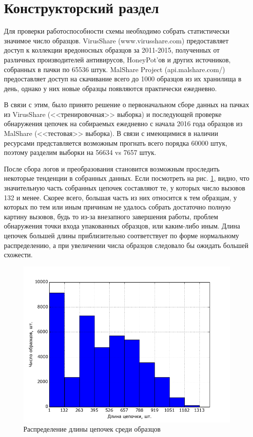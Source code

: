 \section {Конструкторский раздел}
Для проверки работоспособности схемы необходимо собрать статистически значимое число образцов. 
VirusShare (www.virusshare.com) предоставляет доступ к коллекции вредоносных образцов за 2011-2015, полученных от различных производителей антивирусов, HoneyPot'ов и других источников, собранных в пачки по 65536 штук.
MalShare Project (api.malshare.com/) предоставляет доступ на скачивание  всего до 1000 образцов из их хранилища в день, однако у них новые образцы появляются практически ежедневно.

В связи с этим, было принято решение о первоначальном сборе данных на пачках из VirusShare (<<тренировочная>> выборка) и последующей проверке обнаружения цепочек на собираемых ежедневно с начала 2016 года образцов из MalShare (<<тестовая>> выборка). В связи с имеющимися в наличии ресурсами представляется возможным прогнать всего порядка 60000 штук, поэтому разделим выборки на 56634 vs 7657 штук.

После сбора логов и преобразования становится возможным проследить некоторые тенденции в собранных данных. Если посмотреть на рис. \ref{fig:seq_len_hist}, видно, что значительную часть собранных цепочек составляют те, у которых число вызовов 132 и менее. Скорее всего, большая часть из них относится к тем образцам, у которых по тем или иным причинам не удалось собрать достаточно полную картину вызовов, будь то из-за внезапного завершения работы, проблем обнаружения точки входа упакованных образцов, или каким-либо иным. Длина цепочек большей длины приблизительно соответствует по форме нормальному распределению, а при увеличении числа образцов следовало бы ожидать большей схожести.

\begin {figure}[ht]
        \centering
        \includegraphics[width=\linewidth] {img/sequence_len_hist.png}
        \caption {Распределение длины цепочек среди образцов}
        \label {fig:seq_len_hist}
\end {figure}


